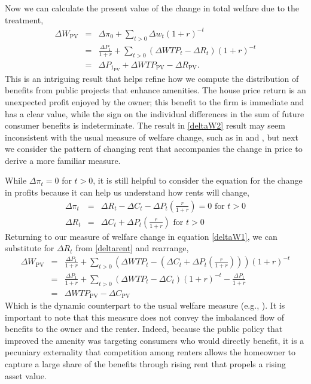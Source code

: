 \documentclass[ecta,nameyear,draft]{econsocart}
\theoremstyle{plain}
\theoremstyle{remark}
\begin{document}
Now we can calculate the present value of the change in total welfare due to the treatment,
\begin{eqnarray}
	\Delta W_{\mathrm{PV}}&=&\Delta \pi_0+\sum_{t>0}\Delta w_t(1+r)^{-t}\nonumber\\
	&=&\frac{\Delta P_1}{1+r}+\sum_{t>0} (\Delta \mathit{WTP}_t-\Delta R_t)(1+r)^{-t} \label{deltaW1}\\
	&=&\Delta P_{1_{\mathrm{PV}}}+\Delta\mathit{WTP}_\mathrm{PV}-\Delta R_{\mathrm{PV}}.\label{deltaW2}
\end{eqnarray}
This is an intriguing result that helps refine how we compute the distribution of benefits from public projects that enhance amenities. The house price return is an unexpected profit enjoyed by the owner; this benefit to the firm is immediate and has a clear value, while the sign on the individual differences in the sum of future consumer benefits is indeterminate. The result in \ref{deltaW2} result may seem inconsistent with the usual measure of welfare change, such as in \cite{freeman14} and \cite{banzhaf20}, but next we consider the pattern of changing rent that accompanies the change in price to derive a more familiar measure. 

While $\Delta\pi_t=0$ for $t>0$, it is still helpful to consider the equation for the change in profits because it can help us understand how rents will change,
\begin{eqnarray}
	\Delta \pi_t &=& \Delta R_t-\Delta C_t-\Delta P_t\left(\frac{r}{1+r}\right)=0 \text{ for } t>0\nonumber\\
	\Delta R_t &=& \Delta C_t+\Delta P_t \left(\frac{r}{1+r}\right)  \text{ for } t>0\label{deltarent}
\end{eqnarray}
Returning to our measure of welfare change in equation \ref{deltaW1}, we can substitute for $\Delta R_t$  from \ref{deltarent} and rearrange,
\begin{eqnarray}
	\Delta W_{\mathrm{PV}}&=&\frac{\Delta P_1}{1+r}+\sum_{t>0} \left(\Delta \mathit{WTP}_t-\left(\Delta C_t+\Delta P_t \left(\frac{r}{1+r}\right)\right)\right)(1+r)^{-t} \nonumber\\
	&=&\frac{\Delta P_1}{1+r}+\sum_{t>0} (\Delta \mathit{WTP}_t-\Delta C_t)(1+r)^{-t}-\frac{\Delta P_1}{1+r}\nonumber\\
	&=&\Delta \mathit{WTP}_{\mathrm{PV}}-\Delta C_{\mathrm{PV}}\nonumber %
\end{eqnarray}
Which is the dynamic counterpart to the usual welfare measure (e.g., \cite{freeman14}). It is important to note that this measure does not convey the imbalanced flow of benefits to the owner and the renter. Indeed, because the public policy that improved the amenity was targeting consumers who would directly benefit, it is a pecuniary externality that competition among renters allows the homeowner to capture a large share of the benefits through rising rent that propels a rising asset value.
\end{document}

